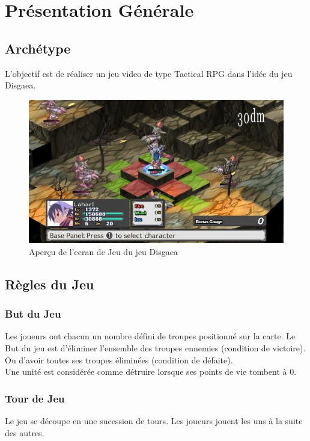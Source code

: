 \chapter{Présentation Générale}



\section{Archétype}

L'objectif est de réaliser un jeu video de type Tactical RPG dans l'idée du jeu Disgaea.


\begin{figure}[H]
\includegraphics[width=\linewidth]{images/disgaea_exemple.png}
\centering
\caption{Aperçu de l'ecran de Jeu du jeu Disgaea}
\label{fig:img1}
\end{figure}



\section{Règles du Jeu}


\subsection{But du Jeu}
Les joueurs ont chacun un nombre défini de troupes positionné sur la carte.
Le But du jeu est d'éliminer l'ensemble des troupes ennemies (condition de victoire).
Ou d'avoir toutes ses troupes éliminées (condition de défaite).
\\
Une unité est considérée comme détruire lorsque ses points de vie tombent à 0.

\subsection{Tour de Jeu}
Le jeu se découpe en une sucession de tours. Les joueurs jouent les uns à la suite des autres.

